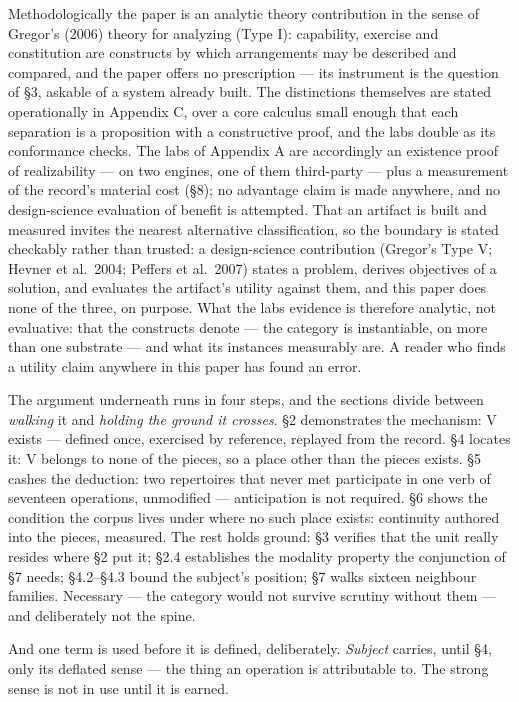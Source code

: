 \documentclass[
]{article}
\newcounter{none} %
\begin{document}
Methodologically the paper is an analytic theory contribution in the
sense of Gregor's (2006) theory for analyzing (Type I): capability,
exercise and constitution are constructs by which arrangements may be
described and compared, and the paper offers no prescription --- its
instrument is the question of §3, askable of a system already built. The
distinctions themselves are stated operationally in Appendix C, over a
core calculus small enough that each separation is a proposition with a
constructive proof, and the labs double as its conformance checks. The
labs of Appendix A are accordingly an existence proof of realizability
--- on two engines, one of them third-party --- plus a measurement of
the record's material cost (§8); no advantage claim is made anywhere,
and no design-science evaluation of benefit is attempted. That an
artifact is built and measured invites the nearest alternative
classification, so the boundary is stated checkably rather than trusted:
a design-science contribution (Gregor's Type V; Hevner et al.~2004;
Peffers et al.~2007) states a problem, derives objectives of a solution,
and evaluates the artifact's utility against them, and this paper does
none of the three, on purpose. What the labs evidence is therefore
analytic, not evaluative: that the constructs denote --- the category is
instantiable, on more than one substrate --- and what its instances
measurably are. A reader who finds a utility claim anywhere in this
paper has found an error.

The argument underneath runs in four steps, and the sections divide
between \emph{walking} it and \emph{holding the ground it crosses}. §2
demonstrates the mechanism: V exists --- defined once, exercised by
reference, replayed from the record. §4 locates it: V belongs to none of
the pieces, so a place other than the pieces exists. §5 cashes the
deduction: two repertoires that never met participate in one verb of
seventeen operations, unmodified --- anticipation is not required. §6
shows the condition the corpus lives under where no such place exists:
continuity authored into the pieces, measured. The rest holds ground: §3
verifies that the unit really resides where §2 put it; §2.4 establishes
the modality property the conjunction of §7 needs; §4.2--§4.3 bound the
subject's position; §7 walks sixteen neighbour families. Necessary ---
the category would not survive scrutiny without them --- and
deliberately not the spine.

And one term is used before it is defined, deliberately. \emph{Subject}
carries, until §4, only its deflated sense --- the thing an operation is
attributable to. The strong sense is not in use until it is earned.
\end{document}

